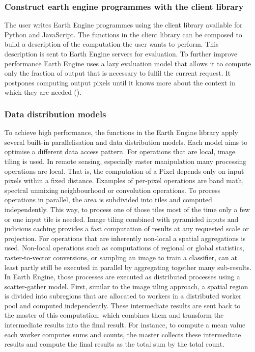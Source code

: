 \subsubsection{Construct earth engine programmes with the client library}

The user writes Earth Engine programmes using the client library available for Python and JavaScript.
The functions in the client library can be composed to build a description of the computation the user wants to perform. This description is sent to Earth Engine servers for evaluation. To further improve performance Earth Engine uses a lazy evaluation model that allows it to compute only the fraction of output that is necessary to fulfil the current request. It postpones computing output pixels until it knows more about the context in which they are needed (\cite{gorelick2017google}).


\subsubsection{Data distribution models}

To achieve high performance, the functions in the Earth Engine library apply several built-in parallelisation and data distribution models. Each model aims to optimise a different data access pattern.
For operations that are local, image tiling is used.
In remote sensing, especially raster manipulation many processing operations are local. That is, the computation of a Pixel depends only on input pixels within a fixed distance. Examples of per-pixel operations are band math, spectral unmixing neighbourhood or convolution operations. To process operations in parallel, the area is subdivided into tiles and computed independently. This way, to process one of those tiles most of the time only a few or one input tile is needed. Image tiling combined with pyramided inputs and judicious caching provides a fast computation of results at any requested scale or projection.
For operations that are inherently non-local a spatial aggregations is used.
Non-local operations such as computations of regional or global statistics, raster-to-vector conversions, or sampling an image to train a classifier, can at least partly still be executed in parallel by aggregating together many sub-results. In Earth Engine, those processes are executed as distributed processes using a scatter-gather model. First, similar to the image tiling approach, a spatial region is divided into subregions that are allocated to workers in a distributed worker pool and computed independently. These intermediate results are sent back to the master of this computation, which combines them and transform the intermediate results into the final result. For instance, to compute a mean value each worker computes sums and counts, the master collects these intermediate results and compute the final results as the total sum by the total count.

